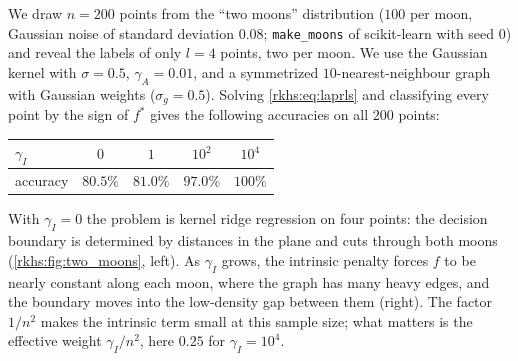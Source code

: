 \begin{notechapter}
\begin{example}
\label{rkhs:ex:manifold_two_moons}
We draw $n = 200$ points from the ``two moons'' distribution ($100$ per moon, Gaussian noise of standard deviation $0.08$; \texttt{make\_moons} of scikit-learn with seed $0$) and reveal the labels of only $l = 4$ points, two per moon. We use the Gaussian kernel with $\sigma = 0.5$, $\gamma_A = 0.01$, and a symmetrized $10$-nearest-neighbour graph with Gaussian weights ($\sigma_g = 0.5$). Solving \eqref{rkhs:eq:laprls} and classifying every point by the sign of $f^*$ gives the following accuracies on all $200$ points:
\begin{center}
\begin{tabular}{lcccc}
\toprule
$\gamma_I$ & $0$ & $1$ & $10^2$ & $10^4$ \\
\midrule
accuracy & $80.5\%$ & $81.0\%$ & $97.0\%$ & $100\%$ \\
\bottomrule
\end{tabular}
\end{center}
With $\gamma_I = 0$ the problem is kernel ridge regression on four points: the decision boundary is determined by distances in the plane and cuts through both moons (\cref{rkhs:fig:two_moons}, left). As $\gamma_I$ grows, the intrinsic penalty forces $f$ to be nearly constant along each moon, where the graph has many heavy edges, and the boundary moves into the low-density gap between them (right). The factor $1/n^2$ makes the intrinsic term small at this sample size; what matters is the effective weight $\gamma_I/n^2$, here $0.25$ for $\gamma_I = 10^4$.
\end{example}


\end{notechapter}
